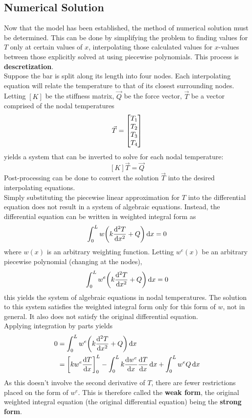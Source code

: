 \documentclass{article}
\begin{document}
		\subsection*{Numerical Solution}
			Now that the model has been established, the method of numerical solution must be determined. This can be done by simplifying the problem to finding values for \(T\) only at certain values of \(x\), interpolating those calculated values for \(x\)-values between those explicitly solved at using piecewise polynomials. This process is \textbf{descretization}. \\
			Suppose the bar is split along its length into four nodes. Each interpolating equation will relate the temperature to that of its closest surrounding nodes. Letting \([K]\) be the stiffness matrix, \(\vec{Q}\) be the force vector, \(\vec{T}\) be a vector comprised of the nodal temperatures
				\[\vec{T} = \mqty[T_1 \\ T_2 \\ T_3 \\ T_4]\]
			yields a system that can be inverted to solve for each nodal temperature:
				\[[K]\vec{T} = \vec{Q}\]
			 Post-processing can be done to convert the solution \(\vec{T}\) into the desired interpolating equations. \\
			 Simply substituting the piecewise linear approximation for \(T\) into the differential equation does not result in a system of algebraic equations. Instead, the differential equation can be written in weighted integral form as
			 	\[\int_0^L w\qty(k\dv[2]{T}{x} + Q) \dd{x} = 0\]
			 where \(w(x)\) is an arbitrary weighting function. Letting \(w^e(x)\) be an arbitrary piecewise polynomial (changing at the nodes),
			 	\[\int_0^L w^e\qty(k\dv[2]{T}{x} + Q) \dd{x} = 0\]
			 this yields the system of algebraic equations in nodal temperatures. The solution to this system satisfies the weighted integral form only for this form of \(w\), not in general. It also does not satisfy the original differential equation. \\
			Applying integration by parts yields
				\begin{align*}
					0 &= \int_0^L w^e\qty(k\dv[2]{T}{x} + Q) \dd{x} \\
						&= \qty[kw^e\dv{T}{x}]_0^L - \int_0^Lk\dv{w^e}{x}\dv{T}{x} \dd{x} + \int_0^L w^eQ \dd{x}
				\end{align*}
			As this doesn't involve the second derivative of \(T\), there are fewer restrictions placed on the form of \(w^e\). This is therefore called the \textbf{weak form}, the original weighted integral equation (the original differential equation) being the \textbf{strong form}. \\
\end{document}

